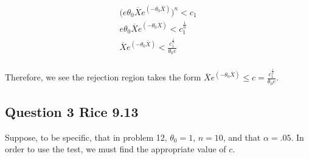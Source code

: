 \documentclass{tufte-book}
\theoremstyle{mytheoremstyle}
\theoremstyle{mylemstyle}
\theoremstyle{mydefstyle}
\begin{document}
\begin{align*}
\big(e \theta_0 \overline{X} e^{(-\theta_0 \overline{X})}\big)^n < c_1\\
e \theta_0 \overline{X} e^{(-\theta_0 \overline{X})} < c_1^{\frac{1}{n}}\\
\overline{X} e^{(-\theta_0 \overline{X})} < \frac{c_1^{\frac{1}{n}}}{\theta_0 e}\\
\end{align*}

Therefore, we see the rejection region takes the form $\overline{X} e^{(-\theta_0 \overline{X})} \leq c =\frac{c_1^{\frac{1}{n}}}{\theta_0 e}$.

\subsection{Question 3 Rice 9.13}
Suppose, to be specific, that in problem 12, $\theta_0=1$, $n=10$, and that $\alpha=.05$.  In order to use the test, we must find the appropriate value of $c$.
\end{document}
